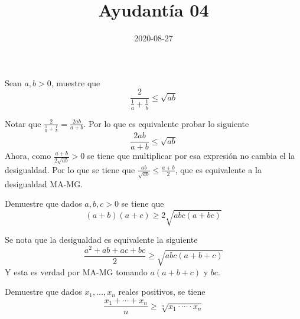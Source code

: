\documentclass{ayudantia}
\title{Ayudantía 04}
\date{2020-08-27}
\begin{document}
\maketitle

\begin{prob}
    Sean \(a,b>0\), muestre que
    \begin{equation*}
        \frac2{\frac1a+\frac1b}\leq\sqrt{ab}
    \end{equation*}
\end{prob}

\begin{ans}
    \begin{sol}
        Notar que \(\frac2{\frac1a+\frac1b}=\frac{2ab}{a+b}\). Por lo que es equivalente probar lo siguiente
        \begin{equation*}
            \frac{2ab}{a+b}\leq\sqrt{ab}
        \end{equation*}
        Ahora, como \(\frac{a+b}{2\sqrt{ab}}>0\) se tiene que multiplicar por esa expresión no cambia el la desigualdad. Por lo que se tiene que \(\frac{ab}{\sqrt{ab}}\leq\frac{a+b}2\), que es equivalente a la desigualdad MA-MG.
    \end{sol}
\end{ans}


\begin{prob}
    Demuestre que dados \(a,b,c>0\) se tiene que
    \begin{equation*}
        (a+b)(a+c)\geq2\sqrt{abc(a+bc)}
    \end{equation*}
\end{prob}

\begin{ans}
    \begin{sol}
        Se nota que la desigualdad es equivalente la siguiente
        \begin{equation*}
            \frac{a^2+ab+ac+bc}2\geq\sqrt{abc(a+b+c)}
        \end{equation*}
        Y esta es verdad por MA-MG tomando \(a(a+b+c)\) y \(bc\).
    \end{sol}
\end{ans}


\begin{prob}
    Demuestre que dados \(x_1,\dots,x_n\) reales positivos, se tiene
    \begin{equation*}
        \frac{x_1+\cdots+x_n}n\geq\sqrt[n]{x_1\cdot\cdots\cdot x_n}
    \end{equation*}
\end{prob}
\end{document}
